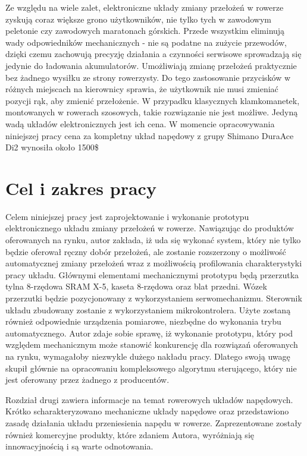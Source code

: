 Ze względu na wiele zalet, elektroniczne układy zmiany przełożeń w rowerze zyskują coraz większe grono użytkowników, nie tylko tych w zawodowym peletonie czy zawodowych maratonach górskich. Przede wszystkim eliminują wady odpowiedników mechanicznych - nie są podatne na zużycie przewodów, dzięki czemu zachowują precyzję działania a czynności serwisowe sprowadzają się jedynie do ładowania akumulatorów. Umożliwiają zmianę przełożeń praktycznie bez żadnego wysiłku ze strony rowerzysty. Do tego zastosowanie przycisków w różnych miejscach na kierownicy sprawia, że użytkownik nie musi zmieniać pozycji rąk, aby zmienić przełożenie. W przypadku klasycznych klamkomanetek, montowanych w rowerach szosowych, takie rozwiązanie nie jest możliwe. Jedyną wadą układów elektronicznych jest ich cena. W momencie opracowywania niniejszej pracy cena za kompletny układ napędowy z grupy Shimano DuraAce Di2 wynosiła około 1500\$

\section{Cel i zakres pracy}
\label{sec:Cel Pracy}
Celem niniejszej pracy jest zaprojektowanie i wykonanie prototypu elektronicznego układu zmiany przełożeń w rowerze. Nawiązując do produktów oferowanych na rynku, autor zakłada, iż uda się wykonać system, który nie tylko będzie oferował ręczny dobór przełożeń, ale zostanie rozszerzony o możliwość automatycznej zmiany przełożeń wraz z możliwością profilowania charakterystyki pracy układu. Głównymi elementami mechanicznymi prototypu będą przerzutka tylna 8-rzędowa SRAM X-5, kaseta 8-rzędowa oraz blat przedni. Wózek przerzutki będzie pozycjonowany z wykorzystaniem serwomechanizmu. Sterownik układu zbudowany zostanie z wykorzystaniem mikrokontrolera. Użyte zostaną również odpowiednie urządzenia pomiarowe, niezbędne do wykonania trybu automatycznego. Autor zdaje sobie sprawę, iż wykonanie prototypu, który pod względem mechanicznym może stanowić konkurencję dla rozwiązań oferowanych na rynku, wymagałoby niezwykle dużego nakładu pracy. Dlatego swoją uwagę skupił głównie na opracowaniu kompleksowego algorytmu sterującego, który nie jest oferowany przez żadnego z producentów.

Rozdział drugi zawiera informacje na temat rowerowych układów napędowych. Krótko scharakteryzowano mechaniczne układy napędowe oraz przedstawiono zasadę działania układu przeniesienia napędu w rowerze. Zaprezentowane zostały również komercyjne produkty, które zdaniem Autora, wyróżniają się innowacyjnością i są warte odnotowania.  

